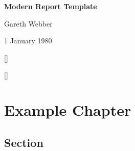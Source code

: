 \documentclass[11pt]{report}
\begin{document}
\begin{titlepage}
\pagecolor{titlepagecolor}\color{white}
{\noindent \titlefont \LARGE \bfseries Modern Report Template}\\
\makebox[0pt][l]{\rule{1.3\textwidth}{2pt}}
\par {\noindent \titlefont \textcolor{namecolor}{Gareth Webber}}
\vskip 3cm
{\noindent \lipsum[1]}
\par {\noindent  \textcolor{namecolor}{1 January 1980}}
\end{titlepage}
\restoregeometry 
\pagecolor{white}

\titleformat{\chapter}[block]{\Huge\titlefont\bfseries}{\thechapter}{0ex}{\centering} []
\tableofcontents

\titleformat{\chapter}[block]{\Huge\titlefont\bfseries}{\centering\thechapter\vskip -10pt}{0ex}{\centering\rule{0.3\textwidth}{2pt}\vskip 0pt\centering} []
\chapter{Example Chapter}
\lipsum[1-8]
\section{Section}
\lipsum[8-12]
\end{document}
